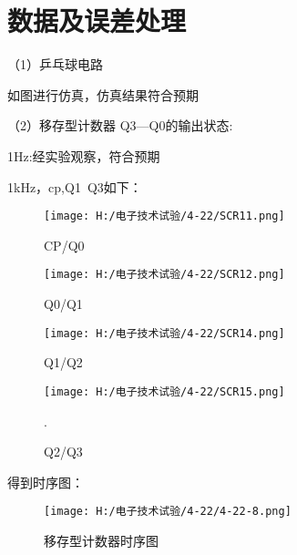 \documentclass{article}
\begin{document}
\section{ 数据及误差处理}
（1）乒乓球电路\par
如图进行仿真，仿真结果符合预期


（2）移存型计数器
Q3—Q0的输出状态:  \par
1Hz:经实验观察，符合预期\par
1kHz，cp,Q1~Q3如下：
\begin{figure}[h]
    \begin{minipage}[t]{0.5\linewidth} %
      \centering   
      \texttt{[image: H:/电子技术试验/4-22/SCR11.png]}   
      \caption{CP/Q0}   
      \label{fig:side:a}   
    \end{minipage}%
    \begin{minipage}[t]{0.5\linewidth}   
      \centering   
      \texttt{[image: H:/电子技术试验/4-22/SCR12.png]}   
      \caption{Q0/Q1}   
      \label{fig:side:b}   
    \end{minipage}   
\end{figure}
    \begin{figure}[h]
        \begin{minipage}[t]{0.5\linewidth} %
          \centering   
          \texttt{[image: H:/电子技术试验/4-22/SCR14.png]}   
          \caption{Q1/Q2}   
          \label{fig:side:a}   
        \end{minipage}%
        \begin{minipage}[t]{0.5\linewidth}   
          \centering   
          \texttt{[image: H:/电子技术试验/4-22/SCR15.png]}   
          \caption{Q2/Q3}   
          \label{fig:side:b}   
        \end{minipage}   .
    \end{figure}
    \newpage
    得到时序图：
    \begin{figure}[h]
        \centering
        \texttt{[image: H:/电子技术试验/4-22/4-22-8.png]}
        \caption{移存型计数器时序图} \label{fig:aa}
        \end{figure}
\end{document}
